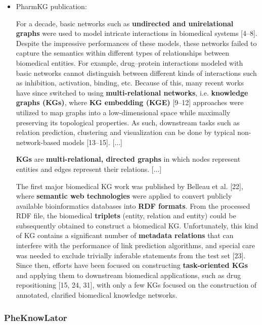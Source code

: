 \documentclass{article}
\begin{document}
\begin{itemize}

\item PharmKG publication:
\begin{displayquote}
For a decade, basic networks such as \textbf{undirected and unirelational graphs} were used to model intricate interactions in biomedical systems [4–8]. Despite the impressive performances of these models, these networks failed to capture the semantics within different types of relationships between biomedical entities. For example, drug–protein interactions modeled with basic networks cannot distinguish between different kinds of interactions such as inhibition, activation, binding, etc. Because of this, many recent works have since switched to using \textbf{multi-relational networks}, i.e. \textbf{knowledge graphs (KGs)}, where \textbf{KG embedding (KGE)} [9–12] approaches were utilized to map graphs into a low-dimensional space while maximally preserving its topological properties. As such, downstream tasks such as relation prediction, clustering and visualization can be done by typical non-network-based models [13–15].
[...]

\textbf{KGs} are \textbf{multi-relational, directed graphs} in which nodes represent entities and edges represent their relations.
[...]

The first major biomedical KG work was published by Belleau et al. [22], where \textbf{semantic web technologies} were applied to convert publicly available bioinformatics databases into \textbf{RDF formats}. From the processed RDF file, the biomedical \textbf{triplets} (entity, relation and entity) could be subsequently obtained to construct a biomedical KG. Unfortunately, this kind of KG contains a significant number of \textbf{metadata relations} that can interfere with the performance of link prediction algorithms, and special care was needed to exclude trivially inferable statements from the test set [23]. Since then, efforts have been focused on constructing \textbf{task-oriented KGs} and applying them to downstream biomedical applications, such as drug repositioning [15, 24, 31], with only a few KGs focused on the construction of annotated, clarified biomedical knowledge networks.
\end{displayquote}

\end{itemize}


\subsubsection{PheKnowLator}
\end{document}
